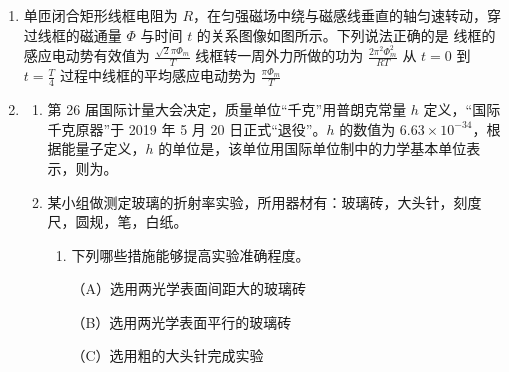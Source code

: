 \documentclass[\gkver]{gaokaozhenti}
\begin{document}
\begin{enumerate}
\item
单匝闭合矩形线框电阻为 $R$，在匀强磁场中绕与磁感线垂直的轴匀速转动，穿过线框的磁通量 $\Phi$ 与时间 $t$ 的关系图像如图所示。下列说法正确的是
{线框的感应电动势有效值为 $\frac{\sqrt{2}\pi\Phi_m}{T}$}
{线框转一周外力所做的功为 $\frac{2\pi^{2}\Phi_m^{2}}{RT}$}
{从 $t = 0$ 到 $t = \frac{T}{4}$ 过程中线框的平均感应电动势为 $\frac{\pi\Phi_m}{T}$}

\item
\begin{enumerate}
	\item
	第 26 届国际计量大会决定，质量单位“千克”用普朗克常量 $h$ 定义，“国际千克原器”于 2019 年 5 月 20 日正式“退役”。$h$ 的数值为 $6.63\times10^{-34}$，根据能量子定义，$h$ 的单位是\tkanswer[1.8cm]{$\UJcdots$}，该单位用国际单位制中的力学基本单位表示，则为\tkanswer[2.4cm]{$\Ukgmqs$}。
	\item
	某小组做测定玻璃的折射率实验，所用器材有：玻璃砖，大头针，刻度尺，圆规，笔，白纸。

	\begin{enumerate}
		\item
		下列哪些措施能够提高实验准确程度。

		（A）选用两光学表面间距大的玻璃砖

		（B）选用两光学表面平行的玻璃砖

		（C）选用粗的大头针完成实验


\end{enumerate}
\end{enumerate}
\end{enumerate}
\end{document}
